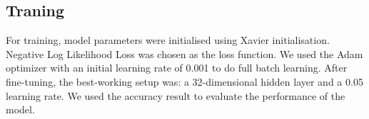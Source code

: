 \subsection{Traning}
For training, model parameters were initialised using Xavier initialisation. Negative Log Likelihood Loss was chosen as the loss function. We used the Adam optimizer with an initial learning rate of 0.001 to do full batch learning. After fine-tuning, the best-working setup was: a 32-dimensional hidden layer and a 0.05 learning rate. We used the accuracy result to evaluate the performance of the model. 











